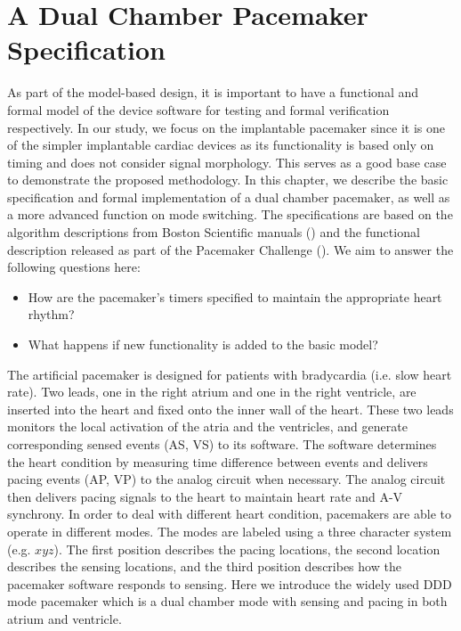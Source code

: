 \chapter{A Dual Chamber Pacemaker Specification}

As part of the model-based design, it is important to have a functional and formal model of the device software for testing and formal verification respectively. In our study, we focus on the implantable  pacemaker since it is one of the simpler implantable cardiac devices as its functionality is based only on timing and does not consider signal morphology. This serves as a good base case to demonstrate the proposed methodology.  In this chapter, we describe the basic specification and formal implementation of a dual chamber pacemaker, as well as a more advanced function on mode switching. The specifications are based on the algorithm descriptions from Boston Scientific manuals (\cite{compass}) and the functional description released as part of the Pacemaker Challenge (\cite{challenge}). 
We aim to answer the following questions here:
\begin{itemize}
	\vspace{-5pt}
	\item How are the pacemaker's timers specified to maintain the appropriate heart rhythm?
	\vspace{-5pt}
   	\item What happens if new functionality is added to the basic model?
\end{itemize}

The artificial pacemaker is designed for patients with bradycardia (i.e. slow heart rate). Two leads, one in the right atrium and one in the right ventricle, are inserted into the heart and fixed onto the inner wall of the heart. These two leads monitors the local activation of the atria and the ventricles, and generate corresponding sensed events \textsf{(AS, VS)} to its software. The software determines the heart condition by measuring time difference between events and delivers pacing events \textsf{(AP, VP)} to the analog circuit when necessary. The analog circuit then delivers pacing signals to the heart to maintain heart rate and A-V synchrony. In order to deal with different heart condition, pacemakers are able to operate in different modes. The modes are labeled using a three character system (e.g. $xyz$). The first position describes the pacing locations, the second location describes the sensing locations, and the third position describes how the pacemaker software responds to sensing. Here we introduce the widely used DDD mode pacemaker which is a dual chamber mode with sensing and pacing in both atrium and ventricle. 

